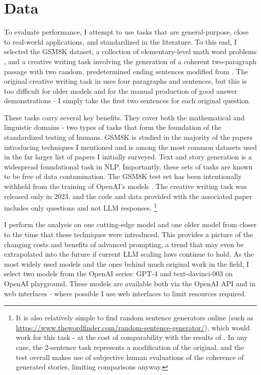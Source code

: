\documentclass[11pt]{article}
\begin{document}
\section*{Data}

To evaluate performance, I attempt to use tasks that are general-purpose, close to real-world applications, and standardized in the literature. To this end, I selected the GSM8K dataset, a collection of elementary-level math word problems \cite{cobbe_training_2021}, and a creative writing task involving the generation of a coherent two-paragraph passage with two random, predetermined ending sentences modified from \citealp{yao_tree_2023}. The original creative writing task in \citealp{yao_tree_2023} uses four paragraphs and sentences, but this is too difficult for older models and for the manual production of good answer demonstrations - I simply take the first two sentences for each original question. 

These tasks carry several key benefits. They cover both the mathematical and linguistic domains - two types of tasks that form the foundation of the standardized testing of humans. GSM8K is studied in the majority of the papers introducing techniques I mentioned and is among the most common datasets used in the far larger list of papers I initially surveyed. Text and story generation is a widespread foundational task in NLP. Importantly, these sets of tasks are known to be free of data contamination. The GSM8K test set has been intentionally withheld from the training of OpenAI's models \cite{openai_gpt-4_2023}. The creative writing task was released only in 2023, and the code and data provided with the associated paper includes only questions and not LLM responses. \footnote{It is also relatively simple to find random sentence generators online (such as \url{https://www.thewordfinder.com/random-sentence-generator/}), which would work for this task - at the cost of comparability with the results of \cite{yao_tree_2023}. In any case, the 2-sentence task represents a modification of the original, and the test overall makes use of subjective human evaluations of the coherence of generated stories, limiting comparisons anyway.}

I perform the analysis on one cutting-edge model and one older model from closer to the time that these techniques were introduced. This provides a picture of the changing costs and benefits of advanced prompting, a trend that may even be extrapolated into the future if current LLM scaling laws continue to hold. As the most widely used models and the ones behind much original work in the field, I select two models from the OpenAI series: GPT-4 and text-davinci-003 on OpenAI playground. These models are available both via the OpenAI API and in web interfaces - where possible I use web interfaces to limit resources required.
\end{document}
